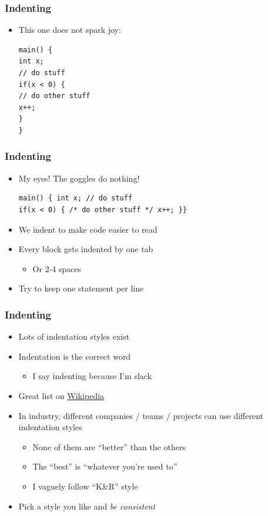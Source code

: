 \documentclass[14pt]{beamer}
\begin{document}
\begin{frame}[fragile]
\frametitle{Indenting}
\begin{itemize}
\item This one does not spark joy:
\begin{lstlisting}[style=CStyle]
main() {
int x;
// do stuff
if(x < 0) {
// do other stuff
x++;
}
}
\end{lstlisting}
\end{itemize}
\end{frame}

\begin{frame}[fragile]
\frametitle{Indenting}
\begin{itemize}
\item My eyes! The goggles do nothing!
\begin{lstlisting}[style=CStyle]
main() { int x; // do stuff
if(x < 0) { /* do other stuff */ x++; }}
\end{lstlisting}
\pause
\item We indent to make code easier to read
\item Every block gets indented by one tab 
	\begin{itemize}
		\item Or 2-4 spaces
	\end{itemize}
\item Try to keep one statement per line
\end{itemize}
\end{frame}

\begin{frame}[fragile]
\frametitle{Indenting}
\begin{itemize}
\item Lots of indentation styles exist
\item Indentation is the correct word
	\begin{itemize}
		\item I say indenting because I'm slack
	\end{itemize}
\item Great list on \underline{\href{https://en.wikipedia.org/wiki/Indentation_style}{Wikipedia}}
\item In industry, different companies / teams / projects can use different indentation styles
	\begin{itemize}
		\item None of them are ``better'' than the others
		\item The ``best'' is ``whatever you're used to''
		\item I vaguely follow ``K\&R'' style
	\end{itemize}
\pause
\item Pick a style you like and \textit{be consistent}
\end{itemize}
\end{frame}
\end{document}
